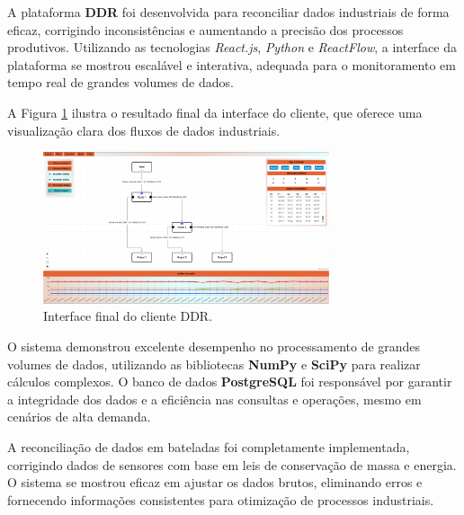 \label{Cap:Resultados}

A plataforma \textbf{DDR} foi desenvolvida para reconciliar dados industriais de forma eficaz, corrigindo inconsistências e aumentando a precisão dos processos produtivos. Utilizando as tecnologias \textit{React.js}, \textit{Python} e \textit{ReactFlow}, a interface da plataforma se mostrou escalável e interativa, adequada para o monitoramento em tempo real de grandes volumes de dados.

A Figura \ref{fig:ReactFlowPicture} ilustra o resultado final da interface do cliente, que oferece uma visualização clara dos fluxos de dados industriais.

\begin{figure}[htbp!]
    \begin{center}
        \includegraphics[width=0.75\textwidth]{figuras/principal.png}
        \caption{Interface final do cliente DDR.}
        \label{fig:ReactFlowPicture}
    \end{center}
\end{figure}

O sistema demonstrou excelente desempenho no processamento de grandes volumes de dados, utilizando as bibliotecas \textbf{NumPy} e \textbf{SciPy} para realizar cálculos complexos. O banco de dados \textbf{PostgreSQL} foi responsável por garantir a integridade dos dados e a eficiência nas consultas e operações, mesmo em cenários de alta demanda.

A reconciliação de dados em bateladas foi completamente implementada, corrigindo dados de sensores com base em leis de conservação de massa e energia. O sistema se mostrou eficaz em ajustar os dados brutos, eliminando erros e fornecendo informações consistentes para otimização de processos industriais.

